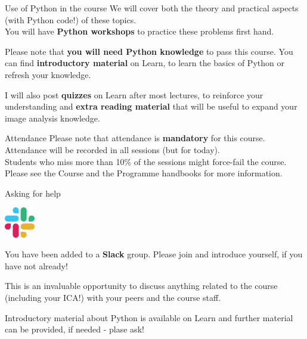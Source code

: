 \documentclass[9pt, aspectratio=169]{beamer}
\begin{document}
\begin{frame}
    {Use of Python in the course}
    We will cover both the theory and practical aspects (with Python code!) of these topics.\\

    You will have \textbf{Python workshops} to practice these problems first hand.\\

    \pause

    Please note that \textbf{you will need Python knowledge} to pass this course. You can find \textbf{introductory material} on Learn, to learn the basics of Python or refresh your knowledge.

    \pause

    I will also post \textbf{quizzes} on Learn after most lectures, to reinforce your understanding and \textbf{extra reading material} that will be useful to expand your image analysis knowledge.\\
\end{frame}

\begin{frame}
{Attendance}
Please note that attendance is \textbf{mandatory} for this course.\\
Attendance will be recorded in all sessions (but for today).\\
Students who miss more than 10\% of the sessions might force-fail the course.\\

Please see the Course and the Programme handbooks for more information.
\end{frame}

\begin{frame}
    {Asking for help}
    \begin{center}
        \includegraphics[width=0.1\textwidth]{slack.png}
    \end{center}

    You have been added to a \textbf{Slack} group. Please join and introduce yourself, if you have not already!

    This is an invaluable opportunity to discuss anything related to the course (including your ICA!) with your peers and the course staff.    

    Introductory material about Python is available on Learn and further material can be provided, if needed - plase ask!    
\end{frame}
\end{document}
